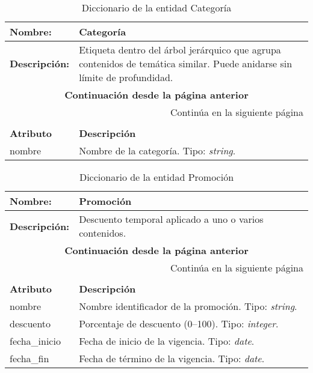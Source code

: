 \renewcommand{\arraystretch}{1.3}
\begin{longtable}{|p{3.5cm}|p{10cm}|}
\caption{Diccionario de la entidad Categoría}
\label{tab:diccionarioCategoria} \\ \hline
\textbf{Nombre:} & Categoría \\ \hline
\textbf{Descripción:} & 
Etiqueta dentro del árbol jerárquico que agrupa contenidos de temática similar.  Puede anidarse sin límite de profundidad. \\ \hline
\endfirsthead
\multicolumn{2}{c}{\textbf{Continuación desde la página anterior}} \\ \hline
\endhead
\hline \multicolumn{2}{r}{{Continúa en la siguiente página}} \\ \hline
\endfoot
\hline
\endlastfoot
\multicolumn{2}{|p{13.5cm}|}{\textbf{ATRIBUTOS}} \\ \hline
\textbf{Atributo} & \textbf{Descripción} \\ \hline
nombre & Nombre de la categoría.  
Tipo: \textit{string}. \\ \hline
\end{longtable}

\renewcommand{\arraystretch}{1.3}
\begin{longtable}{|p{3.5cm}|p{10cm}|}
\caption{Diccionario de la entidad Promoción}
\label{tab:diccionarioPromocion} \\ \hline
\textbf{Nombre:} & Promoción \\ \hline
\textbf{Descripción:} & 
Descuento temporal aplicado a uno o varios contenidos. \\ \hline
\endfirsthead
\multicolumn{2}{c}{\textbf{Continuación desde la página anterior}} \\ \hline
\endhead
\hline \multicolumn{2}{r}{{Continúa en la siguiente página}} \\ \hline
\endfoot
\hline
\endlastfoot
\multicolumn{2}{|p{13.5cm}|}{\textbf{ATRIBUTOS}} \\ \hline
\textbf{Atributo} & \textbf{Descripción} \\ \hline
nombre       & Nombre identificador de la promoción.  
Tipo: \textit{string}. \\ \hline
descuento    & Porcentaje de descuento (0–100).  
Tipo: \textit{integer}. \\ \hline
fecha\_inicio & Fecha de inicio de la vigencia.  
Tipo: \textit{date}. \\ \hline
fecha\_fin   & Fecha de término de la vigencia.  
Tipo: \textit{date}. \\ \hline
\end{longtable}

